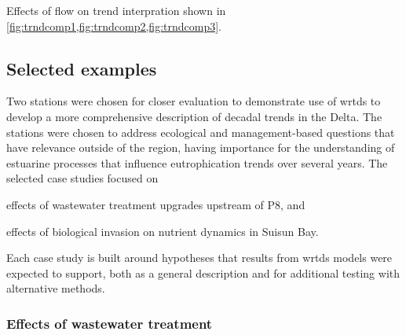 \documentclass[journal = esthag, manuscript = article]{achemso}\usepackage[]{graphicx}\usepackage[]{color}
\begin{document}
Effects of flow on trend interpration shown in \cref{fig:trndcomp1,fig:trndcomp2,fig:trndcomp3}.

\subsection{Selected examples}

Two stations were chosen for closer evaluation to demonstrate use of \ac{wrtds} to develop a more comprehensive description of decadal trends in the Delta.  The stations were chosen to address ecological and management-based questions that have relevance outside of the region, having importance for the understanding of estuarine processes that influence eutrophication trends over several years.  The selected case studies focused on \begin{inparaenum}[1\upshape)]
\item effects of wastewater treatment upgrades upstream of P8, and
\item effects of biological invasion on nutrient dynamics in Suisun Bay.
\end{inparaenum}
Each case study is built around hypotheses that results from \ac{wrtds} models were expected to support, both as a general description and for additional testing with alternative methods. 

\subsubsection{Effects of wastewater treatment}
\end{document}
